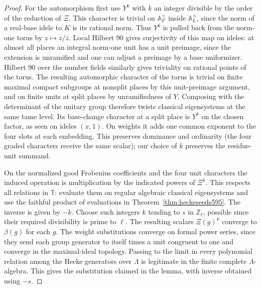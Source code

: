 \documentclass[a4paper,11pt]{article}
\theoremstyle{definition}
\theoremstyle{remark}
\newcommand{\ZZ}{\mathbb Z}\newcommand{\ord}{\operatorname{ord}}
\numberwithin{equation}{section}
\begin{document}
\begin{proof}
For the automorphism first use \(Y^k\) with \(k\) an integer
divisible by the order of the reduction of \(\Xi\).
This character is trivial on \(\mathbb A_F^\times\) inside
\(\mathbb A_L^\times\), since the norm of a real-base idele
to \(K\) is its rational norm. Thus \(Y^k\) is pulled back
from the norm-one torus by \(z\mapsto z/\bar z\).
Local Hilbert 90 gives surjectivity of this map on ideles:
at almost all places an integral norm-one unit has a unit
preimage, since the extension is unramified and one can
adjust a preimage by a base uniformizer. Hilbert 90 over
the number fields similarly gives triviality on rational
points of the torus. The resulting automorphic character
of the torus is trivial on finite maximal compact subgroups
at nonsplit places by this unit-preimage argument, and on
finite units at split places by unramifiedness of \(Y\).
Composing with the determinant of the unitary group
therefore twists classical eigensystems at the same tame
level. Its base-change character at a split place is
\(Y^k\) on the chosen factor, as seen on ideles \((x,1)\).
On weights it adds one common exponent to the four slots
at each embedding. This preserves dominance and ordinarity
(the four graded characters receive the same scalar);
our choice of \(k\) preserves the residue-unit summand.
\cite{XII-IX-geraghty363,XII-IX-blggt560}

On the normalized good Frobenius coefficients and the four
unit characters the induced operation is multiplication
by the indicated powers of \(\Xi^k\). This respects all
relations in \(\mathbb T\): evaluate them on regular
algebraic classical eigensystems and use the faithful
product of evaluations in Theorem~\ref{thm:heckeseeds595}.
The inverse is given by \(-k\). Choose such integers \(k\)
tending to \(s\) in \(\ZZ_\ell\), possible since their
required divisibility is prime to \(\ell\). The resulting
scalars \(\Xi(g)^k\) converge to \(\beta(g)\) for each
\(g\). The weight substitutions converge on formal power
series, since they send each group generator to itself
times a unit congruent to one and converge in the
maximal-ideal topology. Passing to the limit in every
polynomial relation among the Hecke generators over
\(\Lambda\) is legitimate in the finite complete
\(\Lambda\)-algebra. This gives the substitution claimed
in the lemma, with inverse obtained using \(-s\).
\end{proof}
\end{document}

